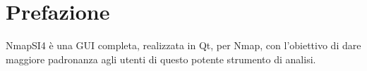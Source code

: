 \chapter*{Prefazione}
\label{ch:Preface}

NmapSI4 \`e una GUI completa, realizzata in Qt, per Nmap, con l'obiettivo di 
dare maggiore padronanza agli utenti di questo potente strumento di analisi.
